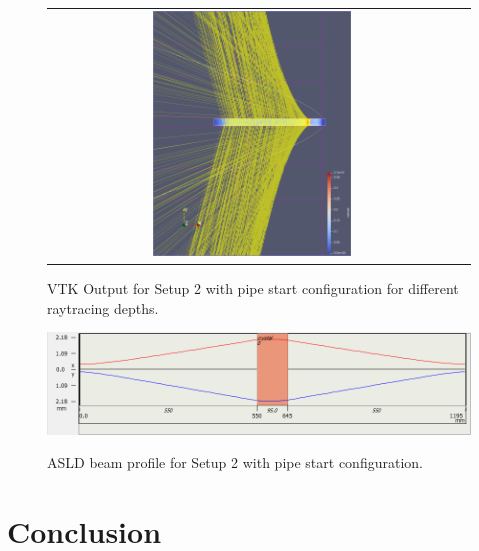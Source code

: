\documentclass[a4paper,10pt]{article}
\begin{document}
\begin{figure}
\begin{tabular}{c c}
            \includegraphics[width=0.5\textwidth]{images/open_pipe/4.png} \\
        \end{tabular}
        \label{fig:setup2_rand_depths}
        \caption[VTK Output for Setup 2 with pipe start configuration
        different raytracing depths]{
            VTK Output for Setup 2 with pipe start configuration for different 
            raytracing depths.
            }
    \end{figure}

    \begin{figure}
        \includegraphics[width=1.0\textwidth]{images/open_pipe/beam.png} \\
        \label{fig:setup2_rand_beam}
        \caption[ASLD beam profile for Setup 2 with pipe start configuration]{
            ASLD beam profile for Setup 2 with pipe start configuration.
        }
    \end{figure}


    \section{Conclusion}
    \newpage

    
    
\end{document}
